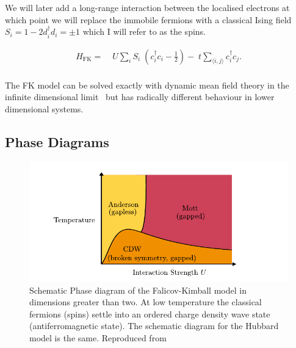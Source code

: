 We will later add a long-range interaction between the localised electrons at which point we will replace the immobile fermions with a classical Ising field \(S_i = 1 - 2d^\dagger_id_i = \pm1\) which I will refer to as the spins.

\[\begin{aligned}
H_{\mathrm{FK}} = & \;U \sum_{i} S_i\;(c^\dagger_{i}c_{i} - \tfrac{1}{2}) -\;t \sum_{\langle i,j\rangle} c^\dagger_{i}c_{j}.\\ 
\end{aligned}\]

The FK model can be solved exactly with dynamic mean field theory in the infinite dimensional limit~\autocite{antipovCriticalExponentsStrongly2014,ribicNonlocalCorrelationsSpectral2016,freericksExactDynamicalMeanfield2003,herrmannNonequilibriumDynamicalCluster2016} but has radically different behaviour in lower dimensional systems.

\hypertarget{phase-diagrams}{%
\subsection{Phase Diagrams}\label{phase-diagrams}}

\hypertarget{fig:fk_phase_diagram}{%
\begin{figure}
\centering
\includegraphics[width=1\textwidth,height=\textheight]{figure_code/background_chapter/fk_phase_diagram}
\caption[{Falicov-Kimball Temperatue-Interaction Phase Diagrams}]{Schematic Phase diagram of the Falicov-Kimball model in dimensions greater than two. At low temperature the classical fermions (spins) settle into an ordered charge density wave state (antiferromagnetic state). The schematic diagram for the Hubbard model is the same. Reproduced from~\autocite{antipovInteractionTunedAndersonMott2016,antipovCriticalExponentsStrongly2014}}
\label{fig:fk_phase_diagram}
\end{figure}
}

